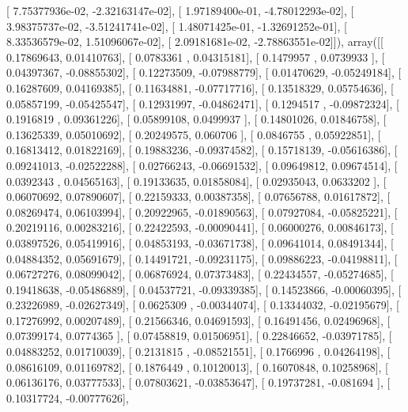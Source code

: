 \documentclass{article}
\begin{document}
       [  7.75377936e-02,  -2.32163147e-02],
       [  1.97189400e-01,  -4.78012293e-02],
       [  3.98375737e-02,  -3.51241741e-02],
       [  1.48071425e-01,  -1.32691252e-01],
       [  8.33536579e-02,   1.51096067e-02],
       [  2.09181681e-02,  -2.78863551e-02]]), array([[ 0.17869643,  0.01410763],
       [ 0.0783361 ,  0.04315181],
       [ 0.1479957 ,  0.0739933 ],
       [ 0.04397367, -0.08855302],
       [ 0.12273509, -0.07988779],
       [ 0.01470629, -0.05249184],
       [ 0.16287609,  0.04169385],
       [ 0.11634881, -0.07717716],
       [ 0.13518329,  0.05754636],
       [ 0.05857199, -0.05425547],
       [ 0.12931997, -0.04862471],
       [ 0.1294517 , -0.09872324],
       [ 0.1916819 ,  0.09361226],
       [ 0.05899108,  0.0499937 ],
       [ 0.14801026,  0.01846758],
       [ 0.13625339,  0.05010692],
       [ 0.20249575,  0.060706  ],
       [ 0.0846755 ,  0.05922851],
       [ 0.16813412,  0.01822169],
       [ 0.19883236, -0.09374582],
       [ 0.15718139, -0.05616386],
       [ 0.09241013, -0.02522288],
       [ 0.02766243, -0.06691532],
       [ 0.09649812,  0.09674514],
       [ 0.0392343 ,  0.04565163],
       [ 0.19133635,  0.01858084],
       [ 0.02935043,  0.0633202 ],
       [ 0.06070692,  0.07890607],
       [ 0.22159333,  0.00387358],
       [ 0.07656788,  0.01617872],
       [ 0.08269474,  0.06103994],
       [ 0.20922965, -0.01890563],
       [ 0.07927084, -0.05825221],
       [ 0.20219116,  0.00283216],
       [ 0.22422593, -0.00090441],
       [ 0.06000276,  0.00846173],
       [ 0.03897526,  0.05419916],
       [ 0.04853193, -0.03671738],
       [ 0.09641014,  0.08491344],
       [ 0.04884352,  0.05691679],
       [ 0.14491721, -0.09231175],
       [ 0.09886223, -0.04198811],
       [ 0.06727276,  0.08099042],
       [ 0.06876924,  0.07373483],
       [ 0.22434557, -0.05274685],
       [ 0.19418638, -0.05486889],
       [ 0.04537721, -0.09339385],
       [ 0.14523866, -0.00060395],
       [ 0.23226989, -0.02627349],
       [ 0.0625309 , -0.00344074],
       [ 0.13344032, -0.02195679],
       [ 0.17276992,  0.00207489],
       [ 0.21566346,  0.04691593],
       [ 0.16491456,  0.02496968],
       [ 0.07399174,  0.0774365 ],
       [ 0.07458819,  0.01506951],
       [ 0.22846652, -0.03971785],
       [ 0.04883252,  0.01710039],
       [ 0.2131815 , -0.08521551],
       [ 0.1766996 ,  0.04264198],
       [ 0.08616109,  0.01169782],
       [ 0.1876449 ,  0.10120013],
       [ 0.16070848,  0.10258968],
       [ 0.06136176,  0.03777533],
       [ 0.07803621, -0.03853647],
       [ 0.19737281, -0.081694  ],
       [ 0.10317724, -0.00777626],
\end{document}
